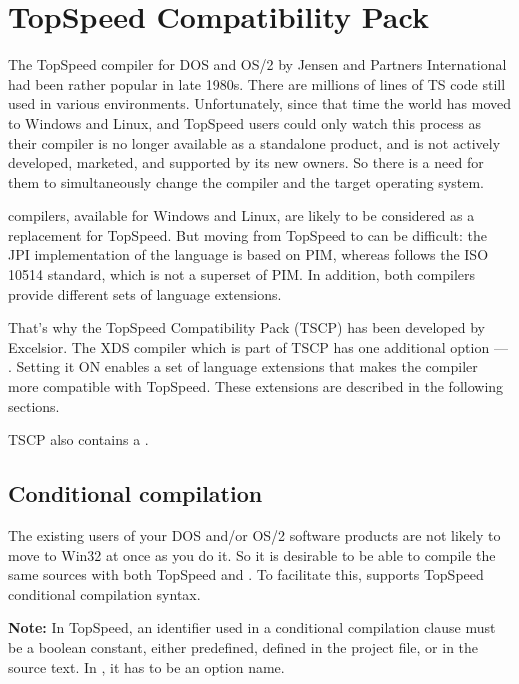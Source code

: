 
\chapter{TopSpeed Compatibility Pack}
\label{tscp}

The TopSpeed \mt{} compiler for DOS and OS/2 by Jensen and Partners
International had been rather popular in late 1980s. There are millions of 
lines of TS \mt{} code still used in various environments. Unfortunately, 
since that time the world has moved to Windows and Linux, and TopSpeed users
could only watch this process as their compiler is no longer available as
a standalone product, and is not actively developed, marketed, and supported
by its new owners. 
So there is a need for them to simultaneously change the compiler and the
target operating system.

\xds{} \mt{} compilers, available for Windows and Linux, are likely
to be considered as a replacement for TopSpeed. But moving from TopSpeed
to \xds{} can be difficult: the JPI implementation of the language is
based on PIM, whereas \xds{} follows the ISO 10514 standard, which is not
a superset of PIM. In addition, both compilers provide different sets of
language extensions.

That's why the TopSpeed Compatibility Pack (TSCP) has been developed by 
Excelsior. The XDS compiler which is part of TSCP has one additional option ---
. Setting it ON enables a set of 
language extensions that makes the compiler more compatible with TopSpeed.
These extensions are described in the following sections.

TSCP also contains a .

\section{Conditional compilation}
\label{tscp:cc}

The existing users of your DOS and/or OS/2 software products are not likely
to move to Win32 at once as you do it. So it is desirable to be able to 
compile the same sources with both TopSpeed and \xds{}. To facilitate this,
\xds{} supports TopSpeed conditional compilation syntax.

{\bf Note:} In TopSpeed, an identifier used in a conditional compilation 
clause must be a boolean constant, either predefined, defined in the project 
file, or in the source text. In \XDS{}, it has to be an option name.

